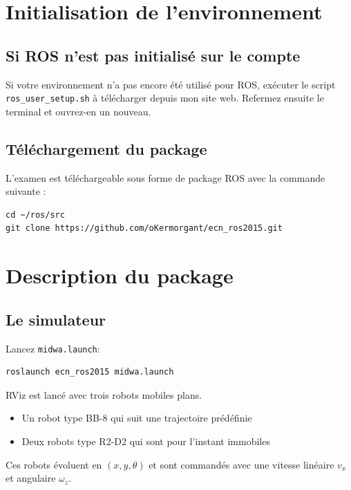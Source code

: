 \documentclass{ecnreport}
\begin{document}




\section{Initialisation de l'environnement}

\subsection{Si ROS n'est pas initialisé sur le compte}

Si votre environnement n'a pas encore été utilisé pour ROS, exécuter le script \texttt{ros\_user\_setup.sh} à télécharger depuis mon site web.
Refermez ensuite le terminal et ouvrez-en un nouveau.

\subsection{Téléchargement du package}

L'examen est téléchargeable sous forme de package ROS avec la commande suivante : 
\begin{center}
\begin{lstlisting}
cd ~/ros/src
git clone https://github.com/oKermorgant/ecn_ros2015.git
\end{lstlisting}
\end{center}

\section{Description du package}

\subsection{Le simulateur}

Lancez \texttt{midwa.launch}:
\begin{center}
\begin{lstlisting}
roslaunch ecn_ros2015 midwa.launch
\end{lstlisting}
\end{center}

\def\vx{v_x}
\def\wz{\omega_z}

RViz est lancé avec trois robots mobiles plans.
\begin{itemize}
 \item Un robot type BB-8 qui suit une trajectoire prédéfinie
 \item Deux robots type R2-D2 qui sont pour l'instant immobiles
\end{itemize}Ces robots évoluent en $(x,y,\theta)$ et sont commandés avec une vitesse linéaire $\vx$ et angulaire $\wz$.
\end{document}

